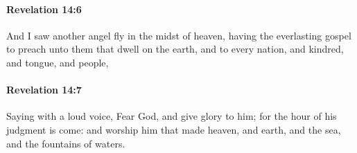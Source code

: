 		\paragraph{Revelation 14:6} %
			\label{REVELATIONNT-14-6}

			And I saw another angel fly in the midst of heaven, having the everlasting gospel to preach unto them that dwell on the earth, and to every nation, and kindred, and tongue, and people,

			\begin{framed}
			\scriptsize
				\begin{compactdesc}
					\item[SBLG] 
				\end{compactdesc}
			\end{framed}

		\paragraph{Revelation 14:7} %
			\label{REVELATIONNT-14-7}

			Saying with a loud voice, Fear God, and give glory to him; for the hour of his judgment is come: and worship him that made heaven, and earth, and the sea, and the fountains of waters.

